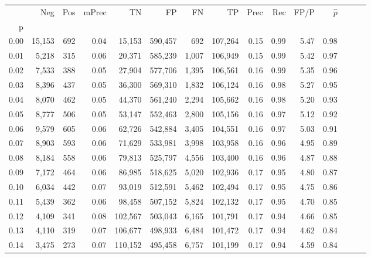 \begin{tabular}{rrrrrrrrrrrrrrr}
\toprule
{} &     Neg &    Pos & mPrec &       TN &       FP &       FN &       TP &  Prec &   Rec &  FP/P & $\hat{p}$ \\
p    &         &        &       &          &          &          &          &       &       &       &           \\
\midrule
0.00 &  15,153 &    692 &  0.04 &   15,153 &  590,457 &      692 &  107,264 &  0.15 &  0.99 &  5.47 &      0.98 \\
0.01 &   5,218 &    315 &  0.06 &   20,371 &  585,239 &    1,007 &  106,949 &  0.15 &  0.99 &  5.42 &      0.97 \\
0.02 &   7,533 &    388 &  0.05 &   27,904 &  577,706 &    1,395 &  106,561 &  0.16 &  0.99 &  5.35 &      0.96 \\
0.03 &   8,396 &    437 &  0.05 &   36,300 &  569,310 &    1,832 &  106,124 &  0.16 &  0.98 &  5.27 &      0.95 \\
0.04 &   8,070 &    462 &  0.05 &   44,370 &  561,240 &    2,294 &  105,662 &  0.16 &  0.98 &  5.20 &      0.93 \\
0.05 &   8,777 &    506 &  0.05 &   53,147 &  552,463 &    2,800 &  105,156 &  0.16 &  0.97 &  5.12 &      0.92 \\
0.06 &   9,579 &    605 &  0.06 &   62,726 &  542,884 &    3,405 &  104,551 &  0.16 &  0.97 &  5.03 &      0.91 \\
0.07 &   8,903 &    593 &  0.06 &   71,629 &  533,981 &    3,998 &  103,958 &  0.16 &  0.96 &  4.95 &      0.89 \\
0.08 &   8,184 &    558 &  0.06 &   79,813 &  525,797 &    4,556 &  103,400 &  0.16 &  0.96 &  4.87 &      0.88 \\
0.09 &   7,172 &    464 &  0.06 &   86,985 &  518,625 &    5,020 &  102,936 &  0.17 &  0.95 &  4.80 &      0.87 \\
0.10 &   6,034 &    442 &  0.07 &   93,019 &  512,591 &    5,462 &  102,494 &  0.17 &  0.95 &  4.75 &      0.86 \\
0.11 &   5,439 &    362 &  0.06 &   98,458 &  507,152 &    5,824 &  102,132 &  0.17 &  0.95 &  4.70 &      0.85 \\
0.12 &   4,109 &    341 &  0.08 &  102,567 &  503,043 &    6,165 &  101,791 &  0.17 &  0.94 &  4.66 &      0.85 \\
0.13 &   4,110 &    319 &  0.07 &  106,677 &  498,933 &    6,484 &  101,472 &  0.17 &  0.94 &  4.62 &      0.84 \\
0.14 &   3,475 &    273 &  0.07 &  110,152 &  495,458 &    6,757 &  101,199 &  0.17 &  0.94 &  4.59 &      0.84 \\

\end{tabular}
